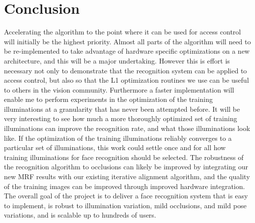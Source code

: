 \section{Conclusion}
Accelerating the algorithm to the point where it can be used for access control will initially be the highest priority.  Almost all parts of the algorithm will need to be re-implemented to take advantage of hardware specific optimizations on a new architecture, and this will be a major undertaking.  However this is effort is necessary not only to demonstrate that the recognition system can be applied to access control, but also so that the L1 optimization routines we use can be useful to others in the vision community.  Furthermore a faster implementation will enable me to perform experiments in the optimization of the training illuminations at a granularity that has never been attempted before.  It will be very interesting to see how much a more thoroughly optimized set of training illuminations can improve the recognition rate, and what those illuminations look like.  If the optimization of the training illuminations reliably converges to a particular set of illuminations, this work could settle once and for all how training illuminations for face recognition should be selected.  The robustness of the recognition algorithm to occlusions can likely be improved by integrating our new MRF results with our existing iterative alignment algorithm, and the quality of the training images can be improved through improved hardware integration.  The overall goal of the project is to deliver a face recognition system that is easy to implement, is robust to illumination variation, mild occlusions, and mild pose variations, and is scalable up to hundreds of users.
